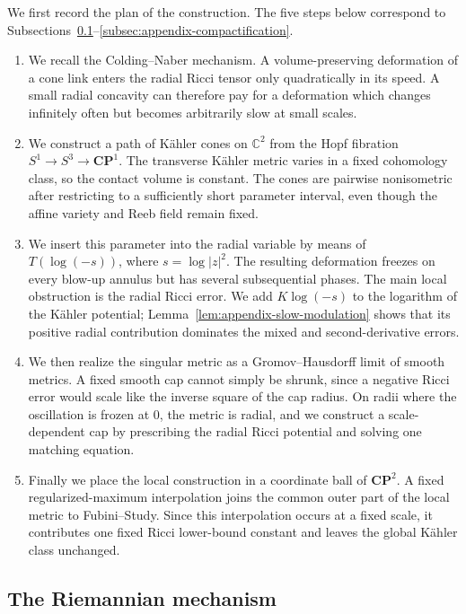 \documentclass[11pt]{amsart}
\theoremstyle{definition}
\theoremstyle{remark}
\begin{document}
We first record the plan of the construction.  The five steps below correspond to Subsections~\ref{subsec:appendix-riemannian}--\ref{subsec:appendix-compactification}.
\begin{enumerate}
\item We recall the Colding--Naber mechanism.  A volume-preserving deformation of a cone link enters the radial Ricci tensor only quadratically in its speed.  A small radial concavity can therefore pay for a deformation which changes infinitely often but becomes arbitrarily slow at small scales.
\item We construct a path of K\"ahler cones on $\mathbb C^2$ from the Hopf fibration $S^1\to S^3\to\mathbf{CP}^1$.  The transverse K\"ahler metric varies in a fixed cohomology class, so the contact volume is constant.  The cones are pairwise nonisometric after restricting to a sufficiently short parameter interval, even though the affine variety and Reeb field remain fixed.
\item We insert this parameter into the radial variable by means of $T(\log(-s))$, where $s=\log|z|^2$.  The resulting deformation freezes on every blow-up annulus but has several subsequential phases.  The main local obstruction is the radial Ricci error.  We add $K\log(-s)$ to the logarithm of the K\"ahler potential; Lemma~\ref{lem:appendix-slow-modulation} shows that its positive radial contribution dominates the mixed and second-derivative errors.
\item We then realize the singular metric as a Gromov--Hausdorff limit of smooth metrics.  A fixed smooth cap cannot simply be shrunk, since a negative Ricci error would scale like the inverse square of the cap radius.  On radii where the oscillation is frozen at $0$, the metric is radial, and we construct a scale-dependent cap by prescribing the radial Ricci potential and solving one matching equation.
\item Finally we place the local construction in a coordinate ball of $\mathbf{CP}^2$.  A fixed regularized-maximum interpolation joins the common outer part of the local metric to Fubini--Study.  Since this interpolation occurs at a fixed scale, it contributes one fixed Ricci lower-bound constant and leaves the global K\"ahler class unchanged.
\end{enumerate}

\subsection{The Riemannian mechanism}
\label{subsec:appendix-riemannian}
\end{document}
